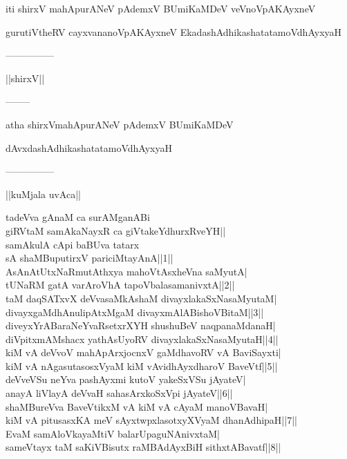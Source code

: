 \documentclass{article}
\begin{document}
\begin{center}
iti shirxV mahApurANeV pAdemxV BUmiKaMDeV veVnoVpAKAyxneV
\end{center}

\begin{center}
gurutiVtheRV cayxvananoVpAKAyxneV EkadashAdhikashatatamoVdhAyxyaH
\end{center}

\begin{center}
---------------
\end{center}

\begin{center}
||shirxV||
\end{center}

\begin{center}
--------
\end{center}

\begin{center}
atha shirxVmahApurANeV pAdemxV BUmiKaMDeV
\end{center}

\begin{center}
dAvxdashAdhikashatatamoVdhAyxyaH
\end{center}

\begin{center}
---------------
\end{center}

\begin{center}
||kuMjala uvAca||
\end{center}

tadeVva gAnaM ca surAMganABi\\
giRVtaM samAkaNayxR ca giVtakeYdhurxRveYH||\\
samAkulA cApi baBUva tatarx\\
sA shaMBuputirxV pariciMtayAnA||1||\\
AsAnAtUtxNaRmutAthxya mahoVtAsxheVna saMyutA|\\
tUNaRM gatA varAroVhA tapoVbalasamanivxtA||2||\\
taM daqSATxvX deVvasaMkAshaM divayxlakaSxNasaMyutaM|\\
divayxgaMdhAnulipAtxMgaM divayxmAlABishoVBitaM||3||\\
diveyxYrABaraNeYvaRsetxrXYH shushuBeV naqpanaMdanaH|\\
diVpitxmAMshacx yathAsUyoRV divayxlakaSxNasaMyutaH||4||\\
kiM vA deVvoV mahApArxjocnxV gaMdhavoRV vA BaviSayxti|\\
kiM vA nAgasutasosxVyaM kiM vAvidhAyxdharoV BaveVtf||5||\\
deVveVSu neYva pashAyxmi kutoV yakeSxVSu jAyateV|\\
anayA liVlayA deVvaH sahasArxkoSxVpi jAyateV||6||\\
shaMBureVva BaveVtikxM vA kiM vA cAyaM manoVBavaH|\\
kiM vA pitusasxKA meV sAyxtwpxlasotxyXVyaM dhanAdhipaH||7||\\
EvaM samAloVkayaMtiV balarUpaguNAnivxtaM|\\
sameVtayx taM saKiVBisutx raMBAdAyxBiH sithxtABavatf||8||
\end{document}
